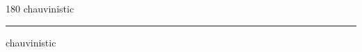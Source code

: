 
\begin{frame}
\begin{center}
\begin{turn}{180}
{\fontsize{2.5cm}{1em}\selectfont chauvinistic}
\end{turn}
\vspace{1em}\par  
\hrule
\vspace{1em}\par  
{\fontsize{2.5cm}{1em}\selectfont chauvinistic}
\end{center}
\end{frame}

